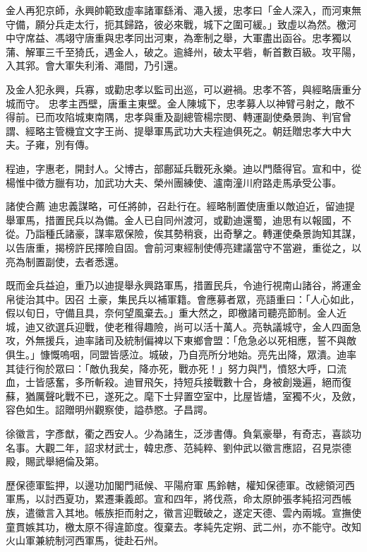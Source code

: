 \begin{pinyinscope}
 金人再犯京師，永興帥範致虛率諸軍繇淆、澠入援，忠孝曰「金人深入，而河東無守備，願分兵走太行，扼其歸路，彼必來戰，城下之圍可緩。」致虛以為然。檄河中守席益、馮翊守唐重與忠孝同出河東，為牽制之舉，大軍盡出函谷。忠孝獨以蒲、解軍三千至猗氏，遇金人，破之。逾絳州，破太平砦，斬首數百級。攻平陽，入其郛。會大軍失利淆、澠間，乃引還。



 及金人犯永興，兵寡，或勸忠孝以監司出巡，可以避禍。忠孝不答，與經略唐重分城而守。
 忠孝主西壁，唐重主東壁。金人陳城下，忠孝募人以神臂弓射之，敵不得前。已而攻陷城東南隅，忠孝與重及副總管楊宗閔、轉運副使桑景詢、判官曾謂、經略主管機宜文字王尚、提舉軍馬武功大夫程迪俱死之。朝廷贈忠孝大中大夫。子雍，別有傳。



 程迪，字惠老，開封人。父博古，部鄜延兵戰死永樂。迪以門蔭得官。宣和中，從楊惟中徵方臘有功，加武功大夫、榮州團練使、瀘南潼川府路走馬承受公事。



 諸使合薦
 迪忠義謀略，可任將帥，召赴行在。經略制置使唐重以敵迫近，留迪提舉軍馬，措置民兵以為備。金人已自同州渡河，或勸迪還蜀，迪思有以報國，不從。乃詣種氏諸豪，謀率眾保險，俟其勢稍衰，出奇擊之。轉運使桑景詢知其謀，以告唐重，揭榜許民擇險自固。會前河東經制使傅亮建議當守不當避，重從之，以亮為制置副使，去者悉還。



 既而金兵益迫，重乃以迪提舉永興路軍馬，措置民兵，令迪行視南山諸谷，將運金帛徙治其中。因召
 土豪，集民兵以補軍籍。會應募者眾，亮語重曰：「人心如此，假以旬日，守備且具，奈何望風棄去。」重大然之，即檄諸司聽亮節制。金人近城，迪又欲選兵迎戰，使老稚得趣險，尚可以活十萬人。亮執議城守，金人四面急攻，外無援兵，迪率諸司及統制偏裨以下東鄉會盟：「危急必以死相應，誓不與敵俱生。」慷慨嗚咽，同盟皆感泣。城破，乃自亮所分地始。亮先出降，眾潰。迪率其徒行徇於眾曰：「敵仇我矣，降亦死，戰亦死！」努力與鬥，憤怒大呼，口流
 血，士皆感奮，多所斬殺。迪冒飛矢，持短兵接戰數十合，身被創幾遍，絕而復蘇，猶厲聲叱戰不已，遂死之。麾下士舁置空室中，比屋皆燼，室獨不火，及斂，容色如生。詔贈明州觀察使，謚恭愍。子昌諤。



 徐徽言，字彥猷，衢之西安人。少為諸生，泛涉書傳。負氣豪舉，有奇志，喜談功名事。大觀二年，詔求材武士，韓忠彥、范純粹、劉仲武以徽言應詔，召見崇德殿，賜武舉絕倫及第。



 歷保德軍監押，以邊功加閣門祗候、平陽府軍
 馬鈴轄，權知保德軍。改總領河西軍馬，以討西夏功，累遷秉義郎。宣和四年，將伐燕，命太原帥張孝純招河西帳族，遣徽言入其地。帳族拒而射之，徽言迎戰破之，遂定天德、雲內兩城。宣撫使童貫嫉其功，檄太原不得違節度。復棄去。孝純先定朔、武二州，亦不能守。改知火山軍兼統制河西軍馬，徙赴石州。




\end{pinyinscope}
